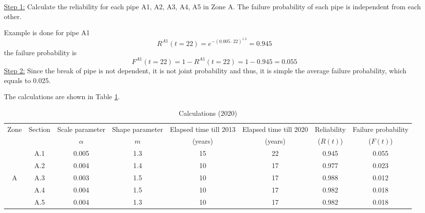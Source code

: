 \underline{Step 1:} Calculate the reliability for each pipe A1, A2, A3, A4, A5 in Zone A. The failure probability of each pipe is independent from each other.

Example is done for pipe A1
\[
{R^{A1}}(t = 22) = {e^{ - {{(0.005 \cdot 22)}^{1.3}}}} = 0.945
\]
the failure probability is
\[
{F^{A1}}(t = 22) = 1 - {R^{A1}}(t = 22) = 1 - 0.945 = 0.055
\]
\underline{Step 2:} Since the break of pipe is not dependent, it is not joint
probability and thus, it is simple the average failure probability, which equals
to 0.025.

The calculations are shown in Table \ref{tbl-reliability-a:11}.
\begin{table}[h]
\caption{Calculations (2020)}
\begin{tabular}{|l|l|l|l|l|l|l|l|}
\hline
\multicolumn{1}{|c|}{Zone} & \multicolumn{1}{c|}{Section} & \multicolumn{1}{c|}{Scale parameter} & \multicolumn{1}{c|}{Shape parameter} & \multicolumn{1}{c|}{Elapsed time till 2013} & \multicolumn{1}{c|}{Elapsed time till 2020} & \multicolumn{1}{c|}{Reliability} & \multicolumn{1}{c|}{Failure probability} \\ 
\multicolumn{1}{|c|}{} & \multicolumn{1}{c|}{} & \multicolumn{1}{c|}{$\alpha$} & \multicolumn{1}{c|}{$m$} & \multicolumn{1}{c|}{(years)} & \multicolumn{1}{c|}{(years)} & \multicolumn{1}{c|}{($R(t)$)} & \multicolumn{1}{c|}{($F(t)$)} \\ 
\hline
\multicolumn{1}{|c|}{} & \multicolumn{1}{c|}{A.1} & \multicolumn{1}{c|}{0.005} & \multicolumn{1}{c|}{1.3} & \multicolumn{1}{c|}{15} & \multicolumn{1}{c|}{22} & \multicolumn{1}{c|}{0.945} & \multicolumn{1}{c|}{0.055} \\ 
\cline{2-8}
\multicolumn{1}{|c|}{} & \multicolumn{1}{c|}{A.2} & \multicolumn{1}{c|}{0.004} & \multicolumn{1}{c|}{1.4} & \multicolumn{1}{c|}{10} & \multicolumn{1}{c|}{17} & \multicolumn{1}{c|}{0.977} & \multicolumn{1}{c|}{0.023} \\ 
\cline{2-8}
\multicolumn{1}{|c|}{A} & \multicolumn{1}{c|}{A.3} & \multicolumn{1}{c|}{0.003} & \multicolumn{1}{c|}{1.5} & \multicolumn{1}{c|}{10} & \multicolumn{1}{c|}{17} & \multicolumn{1}{c|}{0.988} & \multicolumn{1}{c|}{0.012} \\ 
\cline{2-8}
\multicolumn{1}{|c|}{} & \multicolumn{1}{c|}{A.4} & \multicolumn{1}{c|}{0.004} & \multicolumn{1}{c|}{1.5} & \multicolumn{1}{c|}{10} & \multicolumn{1}{c|}{17} & \multicolumn{1}{c|}{0.982} & \multicolumn{1}{c|}{0.018} \\ 
\cline{2-8}
\multicolumn{1}{|c|}{} & \multicolumn{1}{c|}{A.5} & \multicolumn{1}{c|}{0.004} & \multicolumn{1}{c|}{1.3} & \multicolumn{1}{c|}{10} & \multicolumn{1}{c|}{17} & \multicolumn{1}{c|}{0.982} & \multicolumn{1}{c|}{0.018} \\ 
\hline
\end{tabular}
\label{tbl-reliability-a:11}
\end{table}

